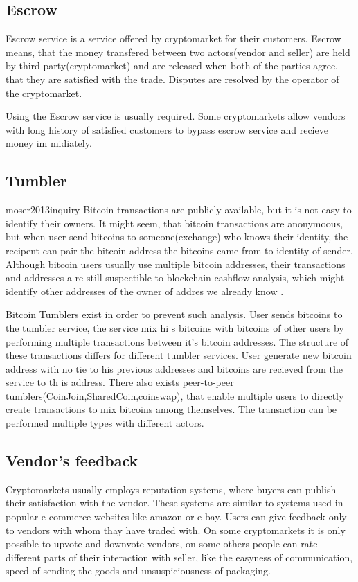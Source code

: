 \documentclass[
  digital, %
  table,   %
  lof,     %
  lot,     %
  oneside
]{fithesis3}
\begin{document}
\subsection{Escrow}
Escrow service is a service offered by cryptomarket for their customers.
Escrow means, that the money transfered between two actors(vendor and seller) are held by third party(cryptomarket)
 and are released when both of the parties agree, that they are satisfied with the trade.
 Disputes are resolved by the operator of the cryptomarket.

 Using the Escrow service is usually required.
 Some cryptomarkets allow vendors with long history of satisfied customers to bypass escrow service and recieve money im
midiately.
 
\subsection{Tumbler}
moser2013inquiry
Bitcoin transactions are publicly available, but it is not easy to identify their owners.
It might seem, that bitcoin transactions are anonymoous, but when user send bitcoins to
someone(exchange) who knows their identity, the recipent can pair the bitcoin address the bitcoins came from
to identity of sender. Although bitcoin users usually use multiple bitcoin addresses, their transactions and addresses a
re still 
suspectible to blockchain cashflow analysis, which might identify other addresses of the owner of addres we already know
.

Bitcoin Tumblers exist in order to prevent such analysis. User sends bitcoins to the tumbler service, the service mix hi
s bitcoins
with bitcoins of other users by performing multiple transactions between it's bitcoin addresses.
The structure of these transactions differs for different tumbler services.
User generate new bitcoin address with no tie to his previous addresses and bitcoins are recieved from the service to th
is address.
 There also exists peer-to-peer tumblers(CoinJoin,SharedCoin,coinswap),
that enable multiple users to directly create transactions to mix bitcoins among themselves.
The transaction can be performed multiple types with different actors.

\subsection{Vendor's feedback}

Cryptomarkets usually employs reputation systems, where buyers can publish their satisfaction with the vendor.
These systems are similar to systems used in popular e-commerce websites like amazon or e-bay.
Users can give feedback only to vendors with whom thay have traded with.
On some cryptomarkets it is only possible to upvote and downvote vendors, on some others people can
rate different parts of their interaction with seller, like the easyness of communication,
speed of sending the goods and unsuspiciousness of packaging.
\end{document}
